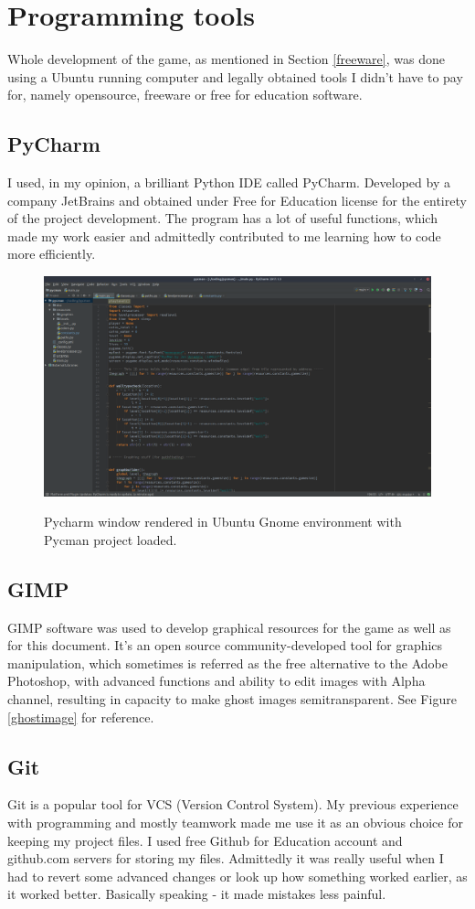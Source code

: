 \documentclass[11pt,a4paper]{report}
\newcommand{\dsubsection}[1]{\FloatBarrier \subsection{#1}}
\newenvironment{img}{
	\begin{center}
		\begin{figure}[H]
			\begin{center}
			
}{
	\end{center}
		\end{figure}
			\end{center}
}
\begin{document}
		\section{Programming tools}
			Whole development of the game, as mentioned in Section \ref{freeware}, was done using a Ubuntu running computer and legally obtained tools I didn't have to pay for, namely opensource, freeware or free for education software.
			\dsubsection{PyCharm}
				I used, in my opinion, a brilliant Python IDE called PyCharm. Developed by a company JetBrains and obtained under Free for Education license for the entirety of the project development. The program has a lot of useful functions, which made my work easier and admittedly contributed to me learning how to code more efficiently.
				\begin{img}
					\includegraphics[width=350pt]{images/pycharm}\\
					\caption{Pycharm window rendered in Ubuntu Gnome environment with Pycman project loaded.}
				\end{img}
			\dsubsection{GIMP}
				GIMP software was used to develop graphical resources for the game as well as for this document. It's an open source community-developed tool for graphics manipulation, which sometimes is referred as the free alternative to the Adobe Photoshop, with advanced functions and ability to edit images with Alpha channel, resulting in capacity to make ghost images semitransparent. See Figure \ref{ghostimage} for reference.
			\dsubsection{Git}
				Git is a popular tool for VCS (Version Control System). My previous experience with programming and mostly teamwork made me use it as an obvious choice for keeping my project files. I used free Github for Education account and github.com servers for storing my files. Admittedly it was really useful when I had to revert some advanced changes or look up how something worked earlier, as it worked better. Basically speaking - it made mistakes less painful.
\end{document}
